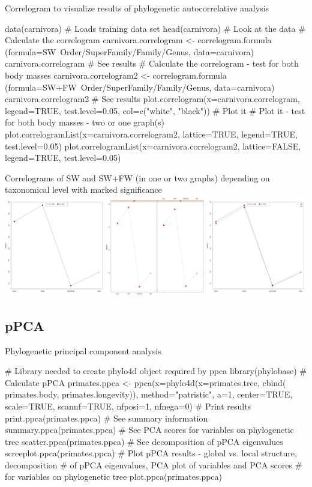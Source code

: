 \documentclass[compress, ucs, xelatex, 11pt, xcolor=svgnames,
  hyperref={
    bookmarks=true,
    unicode=true,
    colorlinks=true,
    pdftitle={Molecular data in R},
    plainpages=false,
    pdfauthor={Vojtech Zeisek},
    pdfsubject={Course about phylogeny and evolution in R},
    pdfcreator={XeLaTeX},
    pdfkeywords={R, evolution, phylogeny, molecular data},
    linkcolor=Tomato,
    anchorcolor=SaddleBrown,
    citecolor=Goldenrod,
    filecolor=DarkMagenta,
    menucolor=Sienna,
    urlcolor=DarkTurquoise,
    pdftex},
  url={hyphens, lowtilde} %
  ]{beamer}
\begin{document}
\begin{frame}[fragile]{Correlogram to visualize results of phylogenetic autocorrelative analysis}
  \begin{spluscode}
    data(carnivora) # Loads training data set
    head(carnivora) # Look at the data
    # Calculate the correlogram
    carnivora.correlogram <- correlogram.formula
      (formula=SW~Order/SuperFamily/Family/Genus, data=carnivora)
    carnivora.correlogram # See results
    # Calculate the correlogram - test for both body masses
    carnivora.correlogram2 <- correlogram.formula
      (formula=SW+FW~Order/SuperFamily/Family/Genus, data=carnivora)
    carnivora.correlogram2 # See results
    plot.correlogram(x=carnivora.correlogram, legend=TRUE,
      test.level=0.05, col=c("white", "black")) # Plot it
    # Plot it - test for both body masses - two or one graph(s)
    plot.correlogramList(x=carnivora.correlogram2, lattice=TRUE,
      legend=TRUE, test.level=0.05)
    plot.correlogramList(x=carnivora.correlogram2, lattice=FALSE,
      legend=TRUE, test.level=0.05)
  \end{spluscode}
\end{frame}

\begin{frame}{Correlograms of SW and SW+FW (in one or two graphs) depending on taxonomical level with marked significance}
\includegraphics[width=\textwidth]{correlog.png}
\end{frame}

\subsection{pPCA}

\begin{frame}[fragile]{Phylogenetic principal component analysis}
  \begin{spluscode}
    # Library needed to create phylo4d object required by ppca
    library(phylobase)
    # Calculate pPCA
    primates.ppca <- ppca(x=phylo4d(x=primates.tree, cbind(
      primates.body, primates.longevity)), method="patristic",
      a=1, center=TRUE, scale=TRUE, scannf=TRUE, nfposi=1, nfnega=0)
    # Print results
    print.ppca(primates.ppca)
    # See summary information
    summary.ppca(primates.ppca)
    # See PCA scores for variables on phylogenetic tree
    scatter.ppca(primates.ppca)
    # See decomposition of pPCA eigenvalues
    screeplot.ppca(primates.ppca)
    # Plot pPCA results - global vs. local structure, decomposition
    # of pPCA eigenvalues, PCA plot of variables and PCA scores
    # for variables on phylogenetic tree
    plot.ppca(primates.ppca)
  \end{spluscode}
\end{frame}
\end{document}
